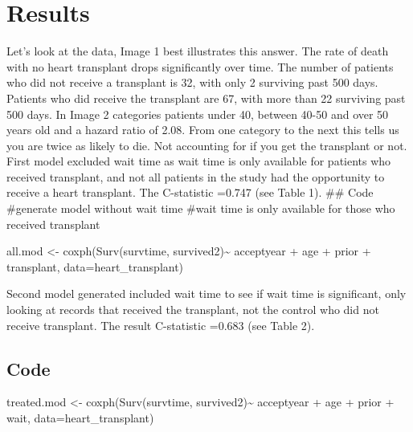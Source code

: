 \documentclass[
  letterpaper,
  DIV=11,
  numbers=noendperiod]{scrreprt}
\newenvironment{Shaded}{\begin{snugshade}}{\end{snugshade}}
\newcommand{\AttributeTok}[1]{\textcolor[rgb]{0.40,0.45,0.13}{#1}}
\newcommand{\FunctionTok}[1]{\textcolor[rgb]{0.28,0.35,0.67}{#1}}
\newcommand{\NormalTok}[1]{\textcolor[rgb]{0.00,0.23,0.31}{#1}}
\newcommand{\OtherTok}[1]{\textcolor[rgb]{0.00,0.23,0.31}{#1}}
\newcommand{\SpecialCharTok}[1]{\textcolor[rgb]{0.37,0.37,0.37}{#1}}
\begin{document}
\hypertarget{results}{%
\chapter{Results}\label{results}}

Let's look at the data, Image 1 best illustrates this answer. The rate
of death with no heart transplant drops significantly over time. The
number of patients who did not receive a transplant is 32, with only 2
surviving past 500 days. Patients who did receive the transplant are 67,
with more than 22 surviving past 500 days. In Image 2 categories
patients under 40, between 40-50 and over 50 years old and a hazard
ratio of 2.08. From one category to the next this tells us you are twice
as likely to die. Not accounting for if you get the transplant or not.
First model excluded wait time as wait time is only available for
patients who received transplant, and not all patients in the study had
the opportunity to receive a heart transplant. The C-statistic =0.747
(see Table 1). \#\# Code \#generate model without wait time \#wait time
is only available for those who received transplant

\begin{Shaded}
\begin{Highlighting}[]
\NormalTok{all.mod }\OtherTok{\textless{}{-}} \FunctionTok{coxph}\NormalTok{(}\FunctionTok{Surv}\NormalTok{(survtime, survived2)}\SpecialCharTok{\textasciitilde{}}\NormalTok{ acceptyear }\SpecialCharTok{+}\NormalTok{ age }\SpecialCharTok{+}\NormalTok{ prior }\SpecialCharTok{+}\NormalTok{ transplant, }\AttributeTok{data=}\NormalTok{heart\_transplant)}
\end{Highlighting}
\end{Shaded}

Second model generated included wait time to see if wait time is
significant, only looking at records that received the transplant, not
the control who did not receive transplant. The result C-statistic
=0.683 (see Table 2).

\hypertarget{code}{%
\section{Code}\label{code}}

\begin{Shaded}
\begin{Highlighting}[]
\NormalTok{treated.mod }\OtherTok{\textless{}{-}} \FunctionTok{coxph}\NormalTok{(}\FunctionTok{Surv}\NormalTok{(survtime, survived2)}\SpecialCharTok{\textasciitilde{}}\NormalTok{ acceptyear }\SpecialCharTok{+}\NormalTok{ age }\SpecialCharTok{+}\NormalTok{ prior }\SpecialCharTok{+}\NormalTok{ wait, }\AttributeTok{data=}\NormalTok{heart\_transplant)}
\end{Highlighting}
\end{Shaded}
\end{document}
